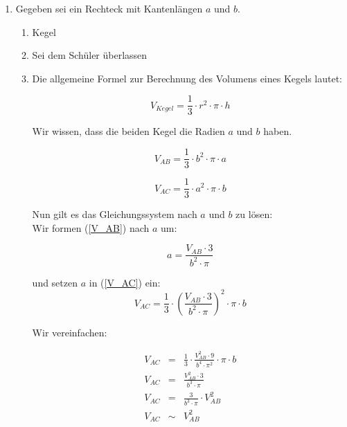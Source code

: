\documentclass{scrartcl}
\begin{document}
	\begin{enumerate}
		\item Gegeben sei ein Rechteck mit Kantenlängen $a$ und $b$. 
			\begin{enumerate}
				\item Kegel	
				\item Sei dem Schüler überlassen
				\item Die allgemeine Formel zur Berechnung des Volumens eines Kegels lautet:
				
					\begin{equation}
						V_{Kegel} =\frac{1}{3}\cdot r^2 \cdot \pi \cdot h 
					\end{equation}
					
					Wir wissen, dass die beiden Kegel die Radien $a$ und $b$ haben. 
					
					\begin{equation}
						\label{V_AB}
						V_{AB} =\frac{1}{3}\cdot b^2 \cdot \pi \cdot a 
					\end{equation}
					
					\begin{equation}
						\label{V_AC}
						V_{AC} =\frac{1}{3}\cdot a^2 \cdot \pi \cdot b 
					\end{equation}
					
					
					Nun gilt es das Gleichungssystem nach $a$ und $b$ zu lösen:\\
					
					Wir formen (\ref{V_AB}) nach $a$ um:
					
					\begin{equation}
						a = \frac{V_{AB} \cdot 3}{b^2 \cdot \pi} 
					\end{equation}
					
					und setzen $a$ in (\ref{V_AC}) ein:
					\begin{equation}
						V_{AC} =\frac{1}{3}\cdot \left (\frac{V_{AB} \cdot 3}{b^2 \cdot \pi} \right )^2 \cdot \pi \cdot b 
					\end{equation}
					
					Wir vereinfachen: 
					
					\begin{eqnarray*}
						V_{AC} &=& \frac{1}{3}\cdot \frac{V_{AB}^2 \cdot 9}{b^4 \cdot \pi^2}  \cdot \pi \cdot b \\
						V_{AC} &=& \frac{V_{AB}^2 \cdot 3}{b^3 \cdot \pi} \\
						V_{AC} &=& \frac{3}{b^3 \cdot \pi} \cdot  V_{AB}^2 \\
						V_{AC} & \sim &   V_{AB}^2 
					\end{eqnarray*}
						

\end{enumerate}
\end{enumerate}
\end{document}
